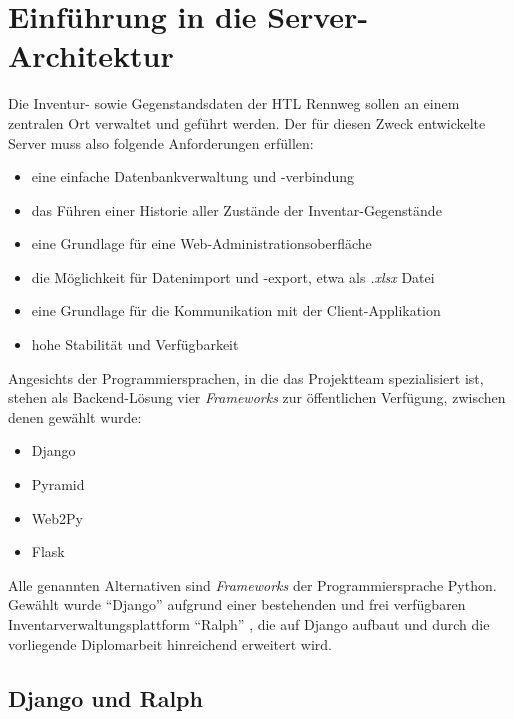 \chapter{Einführung in die Server-Architektur}

Die Inventur- sowie Gegenstandsdaten der HTL Rennweg sollen an einem
zentralen Ort verwaltet und geführt werden. Der für diesen Zweck
entwickelte Server muss also folgende Anforderungen erfüllen:

\begin{itemize}
\tightlist
\item
  eine einfache Datenbankverwaltung und -verbindung
\item
  das Führen einer Historie aller Zustände der Inventar-Gegenstände
\item
  eine Grundlage für eine Web-Administrationsoberfläche
\item
  die Möglichkeit für Datenimport und -export, etwa als
  \emph{.xlsx} Datei
\item
  eine Grundlage für die Kommunikation mit der Client-Applikation
\item
  hohe Stabilität und Verfügbarkeit
\end{itemize}

Angesichts der Programmiersprachen, in die das Projektteam spezialisiert
ist, stehen als Backend-Lösung vier
\emph{Frameworks}
zur öffentlichen Verfügung, zwischen denen gewählt wurde:

\begin{itemize}
\tightlist
\item
  Django \cite{django}
\item
  Pyramid \cite{pyramid}
\item
  Web2Py \cite{web2py}
\item
  Flask \cite{flask}
\end{itemize}

Alle genannten Alternativen sind
\emph{Frameworks}
der Programmiersprache Python. Gewählt wurde ``Django'' aufgrund einer
bestehenden und frei verfügbaren Inventarverwaltungsplattform ``Ralph''
\cite{ralph}, die auf Django aufbaut und durch die vorliegende
Diplomarbeit hinreichend erweitert wird.

\hypertarget{django-und-ralph}{%
\section{Django und Ralph}\label{django-und-ralph}}


